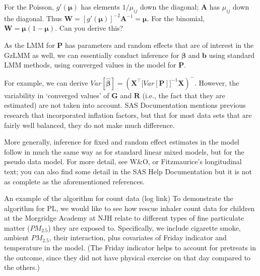 \documentclass[
  9pt,
  ignorenonframetext,
]{beamer}
\begin{document}
\begin{frame}{}
\protect\hypertarget{section-4}{}
For the Poisson, \(g'(\pmb \mu)\) has elements \(1/\mu_{ij}\) down the
diagonal; \(\pmb A\) has \(\mu_{ij}\) down the diagonal. Thus
\(\pmb W=[g' (\pmb \mu)]^{-2} \pmb A^{-1}=\pmb \mu\). For the binomial,
\(\pmb W=\pmb \mu(1- \pmb \mu)\). Can you derive this?

As the LMM for \(\pmb P\) has parameters and random effects that are of
interest in the GzLMM as well, we can essentially conduct inference for
\(\pmb \beta\) and \(\pmb b\) using standard LMM methods, using
converged values in the model for \(\pmb P\).

For example, we can derive
\(Var[\pmb {\hat \beta}] =(\pmb X^{\top} \big[Var[\pmb P]\big]^{-1} \pmb X)^-\).
However, the variability in `converged values' of \(\pmb G\) and
\(\pmb R\) (i.e., the fact that they are estimated) are not taken into
account. SAS Documentation mentions previous research that incorporated
inflation factors, but that for most data sets that are fairly well
balanced, they do not make much difference.

More generally, inference for fixed and random effect estimates in the
model follow in much the same way as for standard linear mixed models,
but for the pseudo data model. For more detail, see W\&O, or
Fitzmaurice's longitudinal text; you can also find some detail in the
SAS Help Documentation but it is not as complete as the aforementioned
references.
\end{frame}

\begin{frame}{An example of the algorithm for count data (log link)}
\protect\hypertarget{an-example-of-the-algorithm-for-count-data-log-link}{}
To demonstrate the algorithm for PL, we would like to see how rescue
inhaler count data for children at the Morgridge Academy at NJH relate
to different types of fine particulate matter (\(PM_{2.5}\)) they are
exposed to. Specifically, we include cigarette smoke, ambient
\(PM_{2.5}\), their interaction, plus covariates of Friday indicator and
temperature in the model. (The Friday indicator helps to account for
pretreats in the outcome, since they did not have physical exercise on
that day compared to the others.)
\end{frame}
\end{document}
